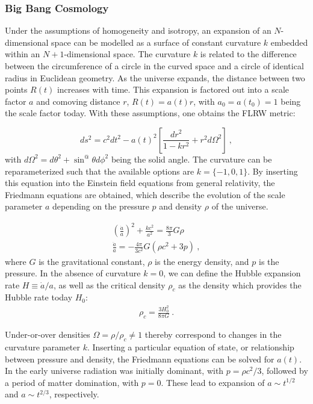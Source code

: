 \subsubsection{Big Bang Cosmology}
Under the assumptions of homogeneity and isotropy, an expansion of an $N$-dimensional space can be modelled as a surface of constant curvature $k$ embedded within an $N+1$-dimensional space. 
The curvature $k$ is related to the difference between the circumference of a circle in the curved space and a circle of identical radius in Euclidean geometry. 
As the universe expands, the distance between two points $R(t)$ increases with time. 
This expansion is factored out into a scale factor $a$ and comoving distance $r$, $R(t) = a(t) r$, with $a_0=a(t_0)=1$ being the scale factor today.
With these assumptions, one obtains the FLRW metric:

\begin{equation}
    ds^2 = c^2dt^2 - a(t)^2 [ \frac{dr^2}{1-kr^2} +  r^2 d\Omega^2]~,
    \label{eq:flrw}
\end{equation}
\noindent
with $d\Omega^2 = d\theta ^2+ \sin^@ \theta d \phi^2$ being the solid angle.
The curvature can be reparameterized such that the available options are $k=\{-1,0,1\}$.
By inserting this equation into the Einstein field equations from general relativity, the Friedmann equations are obtained, which describe the evolution of the scale parameter $a$ depending on the pressure $p$ and density $\rho$ of the universe.

\begin{align}
        (\frac{\dot a}{a})^2 + \frac{k c^2}{a^2} = \frac{8 \pi}{3} {G \rho} \\
 \frac{\ddot a}{a}  = -\frac{4 \pi}{3c^2} G (\rho c^2 + 3p)~,
 \label{eq:friedmann}
\end{align}
\noindent
where $G$ is the gravitational constant, $\rho$ is the energy density, and $p$ is the pressure.
In the absence of curvature $k=0$, we can define the Hubble expansion rate $H \equiv \dot a /a $, as well as the critical density $\rho_c$ as the density which provides the Hubble rate today $H_0$:
\begin{align}
    \rho_c = \frac{3H_0^2}{8 \pi G}~.
\end{align}

Under-or-over densities $\Omega=\rho/\rho_c \neq 1$ thereby correspond to changes in the curvature parameter $k$.
Inserting a particular equation of state, or relationship between pressure and density, the Friedmann equations can be solved for $a(t)$.
In the early universe radiation was initially dominant, with $p = \rho c^2 /3$, followed by a period of matter domination, with $p=0$.
These lead to expansion of $a\sim t^{1/2}$ and $a\sim t^{2/3}$, respectively.

